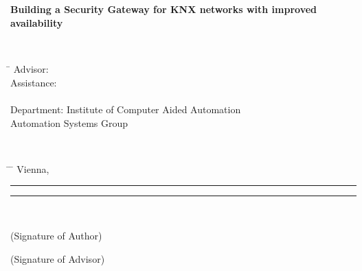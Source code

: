 \begin{center}
{\ \vspace{5cm}}

\begin{minipage}[t][2.8cm][s]{\textwidth}%
\centering
\thesistitlefonthuge\sffamily\bfseries\tuinfthesistitle\\
\bigskip
\bigskip
\bigskip
\bigskip
{\thesistitlefontHUGE\sffamily\bfseries\tuinfthesissubtitle\HUGE}
\\
~
\\
Building a Security Gateway for KNX networks with improved availability
\end{minipage}

{\ \vspace{6cm}}

\vspace{0pt}\raggedright\sffamily\Large
\begin{minipage}[t][4cm][t]{\textwidth}%
  \begin{tabbing}%
	    \hspace{40mm} \= \hspace{66mm} \kill
	    Advisor:\> \tuinfthesisbetreins\\
	    Assistance: \> \tuinfthesisbetrzwei\\
	    \\
	    Department:\>  Institute of Computer Aided Automation\\
	    \>Automation Systems Group
     \end{tabbing}
\end{minipage}

{\ \vspace{4cm}}


\begin{minipage}[t][1.5cm][t]{\textwidth}%
  \vspace{0pt}\sffamily\thesistitlefontnormalsize
  \begin{tabbing}%
    \hspace{45mm} \= \hspace{63mm} \= \hspace{51mm} \kill
    Vienna, \tuinfthesisdate \> {\raggedright\rule{51mm}{0.5pt}} \> {\raggedright\rule{51mm}{0.5pt}} \\
    \> \begin{minipage}[t][0.5cm][t]{51mm}\centering (Signature of Author)\end{minipage}
    \> \begin{minipage}[t][0.5cm][t]{51mm}\centering (Signature of Advisor)\end{minipage}
    \end{tabbing}
\end{minipage}

\end{center}
